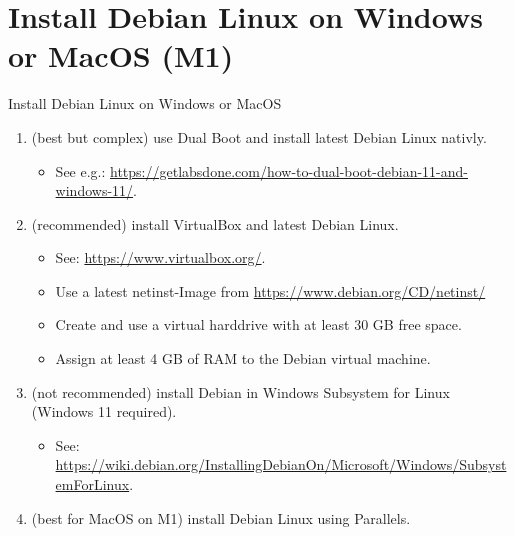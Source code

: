 \withsectionpage

\section{Install Debian Linux on Windows or MacOS (M1)}

\begin{frame}{Install Debian Linux on Windows or MacOS}
  \begin{enumerate}
    \item[Either] (best but complex) use \textcolor{fh-ooe-red}{Dual Boot} and install \textcolor{fh-ooe-red}{latest Debian} Linux \textcolor{fh-ooe-red}{nativly}.
    \begin{itemize}
      \item See e.g.: \textcolor{fh-ooe-red}{\href{https://getlabsdone.com/how-to-dual-boot-debian-11-and-windows-11/}{https://getlabsdone.com/how-to-dual-boot-debian-11-and-windows-11/}}.
    \end{itemize}
    \item[Or] (recommended) install \textcolor{fh-ooe-red}{VirtualBox} and \textcolor{fh-ooe-red}{latest Debian} Linux.
    \begin{itemize}
      \item See: \textcolor{fh-ooe-red}{\href{https://www.virtualbox.org/}{https://www.virtualbox.org/}}.
      \item Use a latest \textcolor{fh-ooe-red}{netinst-Image} from \textcolor{fh-ooe-red}{\href{https://www.debian.org/CD/netinst/}{https://www.debian.org/CD/netinst/}}
      \item Create and use a virtual harddrive with at least \textcolor{fh-ooe-red}{30 GB} free space.
      \item Assign at least \textcolor{fh-ooe-red}{4 GB} of \textcolor{fh-ooe-red}{RAM} to the \textcolor{fh-ooe-red}{Debian virtual machine}.
    \end{itemize}
    \item[Or] (not recommended) install Debian in Windows Subsystem for Linux (Windows 11 required).
    \begin{itemize}
      \item See: \textcolor{fh-ooe-red}{\href{https://wiki.debian.org/InstallingDebianOn/Microsoft/Windows/SubsystemForLinux}{https://wiki.debian.org/InstallingDebianOn/Microsoft/Windows/SubsystemForLinux}}.
    \end{itemize}
    \item[Or] (best for \textcolor{fh-ooe-red}{MacOS} on M1) install Debian Linux using \textcolor{fh-ooe-red}{Parallels}.

\end{enumerate}
\end{frame}
